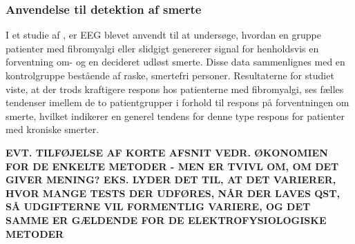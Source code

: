 \subsubsection{Anvendelse til detektion af smerte}
I et studie af \citep{7}, er EEG blevet anvendt til at undersøge, hvordan en gruppe patienter med fibromyalgi eller slidgigt genererer signal for henholdsvis en forventning om- og en decideret udløst smerte. Disse data sammenlignes med en kontrolgruppe bestående af raske, smertefri personer. Resultaterne for studiet viste, at der trods kraftigere respons hos patienterne med fibromyalgi, ses fælles tendenser imellem de to patientgrupper i forhold til respons på forventningen om smerte, hvilket indikerer en generel tendens for denne type respons for patienter med kroniske smerter. \citep{7}
   
\textbf{EVT. TILFØJELSE AF KORTE AFSNIT VEDR. ØKONOMIEN FOR DE ENKELTE METODER - MEN ER TVIVL OM, OM DET GIVER MENING? EKS. LYDER DET TIL, AT DET VARIERER, HVOR MANGE TESTS DER UDFØRES, NÅR DER LAVES QST, SÅ UDGIFTERNE VIL FORMENTLIG VARIERE, OG DET SAMME ER GÆLDENDE FOR DE ELEKTROFYSIOLOGISKE METODER}
